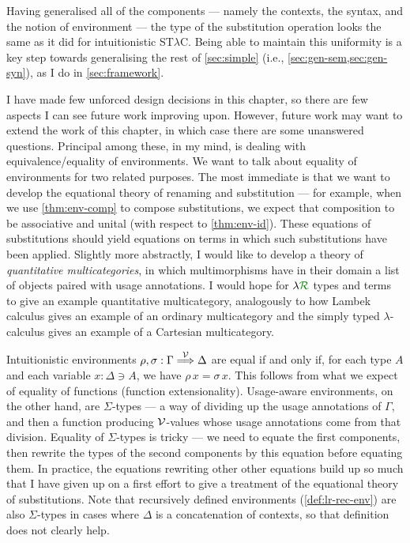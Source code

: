 Having generalised all of the components --- namely the contexts, the syntax,
and the notion of environment --- the type of the substitution operation looks
the same as it did for intuitionistic ST$\lambda$C\@.
Being able to maintain this uniformity is a key step towards generalising the
rest of \cref{sec:simple} (i.e., \cref{sec:gen-sem,sec:gen-syn}), as I do in
\cref{sec:framework}.

I have made few unforced design decisions in this chapter, so there are few
aspects I can see future work improving upon.
However, future work may want to extend the work of this chapter, in which case
there are some unanswered questions.
Principal among these, in my mind, is dealing with equivalence/equality of
environments.
We want to talk about equality of environments for two related purposes.
The most immediate is that we want to develop the equational theory of renaming
and substitution --- for example, when we use \cref{thm:env-comp} to compose
substitutions, we expect that composition to be associative and unital (with
respect to \cref{thm:env-id}).
These equations of substitutions should yield equations on terms in which such
substitutions have been applied.
Slightly more abstractly, I would like to develop a theory of
\emph{quantitative multicategories}, in which multimorphisms have in their
domain a list of objects paired with usage annotations.
I would hope for $\name$ types and terms to give an example quantitative
multicategory, analogously to how Lambek calculus gives an example of an
ordinary multicategory and the simply typed $\lambda$-calculus gives an example
of a Cartesian multicategory.

Intuitionistic environments $\rho, \sigma : \Gamma \stackrel{\mathcal V}\Longrightarrow \Delta$ are equal
if and only if, for each type $A$ and each variable $x : \Delta \ni A$, we have
$\rho\,x = \sigma\,x$.
This follows from what we expect of equality of functions (function
extensionality).
Usage-aware environments, on the other hand, are $\Sigma$-types --- a way of
dividing up the usage annotations of $\Gamma$, and then a function producing
$\mathcal V$-values whose usage annotations come from that division.
Equality of $\Sigma$-types is tricky --- we need to equate the first components,
then rewrite the types of the second components by this equation before equating
them.
In practice, the equations rewriting other other equations build up so much that
I have given up on a first effort to give a treatment of the equational theory
of substitutions.
Note that recursively defined environments (\cref{def:lr-rec-env}) are also
$\Sigma$-types in cases where $\Delta$ is a concatenation of contexts, so that
definition does not clearly help.

